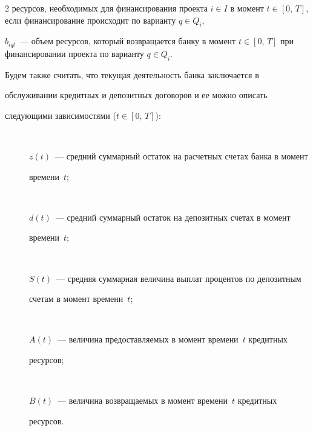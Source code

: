 \begin{multicols}{2}
ресурсов, необходимых для финансирования проекта $i\in I$ в момент $t\in 


[0,\,T]$, если финансирование происходит по варианту $q\in Q_i$, 


$b_{iqt}$~--- объем ресурсов, который возвращается банку в момент $t\in 


[0,\,T]$ при финансировании проекта по варианту $q\in Q_i$.





Будем также считать, что текущая деятельность банка заключается в 


обслуживании кредитных и депозитных договоров и ее можно описать 


сле\-ду\-ющи\-ми зависимостями ($t\in [0,\,T]$):


\begin{description}






\item[\,] $z(t)$~--- средний суммарный остаток на расчетных счетах банка в момент 


времени~$t$; 


\item[\,]




$d(t)$~--- средний суммарный остаток на депозитных счетах в момент 


времени~$t$;


\item[\,]




$S(t)$~--- средняя суммарная величина выплат процентов по депозитным 


счетам в момент времени~$t$; 


\item[\,]




$A(t)$~--- величина предоставляемых в момент времени~$t$ кредитных 


ресурсов;


\item[\,]




$B(t)$~--- величина возвращаемых в момент времени~$t$ кредитных 


ресурсов.


\end{description}



\end{multicols}
